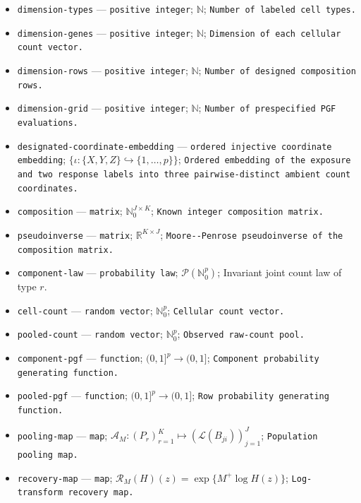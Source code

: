 \documentclass{article}
\begin{document}
\begin{itemize}
  \item \texttt{dimension-\allowbreak{}types} --- \texttt{positive integer}; \(\mathbb N\); \texttt{Number of labeled cell types.}
  \item \texttt{dimension-\allowbreak{}genes} --- \texttt{positive integer}; \(\mathbb N\); \texttt{Dimension of each cellular count vector.}
  \item \texttt{dimension-\allowbreak{}rows} --- \texttt{positive integer}; \(\mathbb N\); \texttt{Number of designed composition rows.}
  \item \texttt{dimension-\allowbreak{}grid} --- \texttt{positive integer}; \(\mathbb N\); \texttt{Number of prespecified PGF evaluations.}
  \item \texttt{designated-\allowbreak{}coordinate-\allowbreak{}embedding} --- \texttt{ordered injective coordinate embedding}; \(\{\iota:\{X,Y,Z\}\hookrightarrow\{1,\ldots,p\}\}\); \texttt{Ordered embedding of the exposure and two response labels into three pairwise-\allowbreak{}distinct ambient count coordinates.}
  \item \texttt{composition} --- \texttt{matrix}; \(\mathbb N_0^{J\times K}\); \texttt{Known integer composition matrix.}
  \item \texttt{pseudoinverse} --- \texttt{matrix}; \(\mathbb R^{K\times J}\); \texttt{Moore-\allowbreak{}-\allowbreak{}Penrose pseudoinverse of the composition matrix.}
  \item \texttt{component-\allowbreak{}law} --- \texttt{probability law}; \(\mathcal P(\mathbb N_0^p)\); Invariant joint count law of type \(r\).
  \item \texttt{cell-\allowbreak{}count} --- \texttt{random vector}; \(\mathbb N_0^p\); \texttt{Cellular count vector.}
  \item \texttt{pooled-\allowbreak{}count} --- \texttt{random vector}; \(\mathbb N_0^p\); \texttt{Observed raw-\allowbreak{}count pool.}
  \item \texttt{component-\allowbreak{}pgf} --- \texttt{function}; \((0,1]^p\to(0,1]\); \texttt{Component probability generating function.}
  \item \texttt{pooled-\allowbreak{}pgf} --- \texttt{function}; \((0,1]^p\to(0,1]\); \texttt{Row probability generating function.}
  \item \texttt{pooling-\allowbreak{}map} --- \texttt{map}; \(\mathscr A_M:(P_r)_{r=1}^K\mapsto(\mathcal L(B_{ji}))_{j=1}^J\); \texttt{Population pooling map.}
  \item \texttt{recovery-\allowbreak{}map} --- \texttt{map}; \(\mathscr R_M(H)(z)=\exp\{M^{+}\log H(z)\}\); \texttt{Log-\allowbreak{}transform recovery map.}

\end{itemize}
\end{document}
